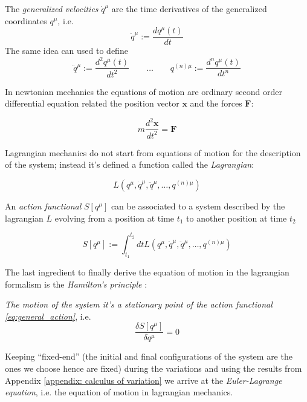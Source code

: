 \begin{definition}
  The \emph{generalized velocities} $\dot{q}^{\mu}$ are the time derivatives of the
  generalized coordinates $q^{\mu}$, i.e.
  \begin{equation*}
    \dot{q}^{\mu} := \frac{dq^{\mu}(t)}{dt}
  \end{equation*}
  The same idea can used to define
  \begin{equation*}
    \ddot{q}^{\mu} := \frac{d^2q^{\mu}(t)}{dt^2} \qquad \ldots \qquad
        q^{(n)\mu} := \frac{d^nq^{\mu}(t)}{dt^n}
  \end{equation*}
\end{definition}

In newtonian mechanics the equations of motion are ordinary second order
differential equation related the position vector $\bm{x}$ and the forces
$\bm{F}$:

\begin{equation*}
  m \frac{d^2\bm{x}}{dt^2} = \bm{F}
\end{equation*}

Lagrangian mechanics do not start from equations of motion for the description
of the system; instead it's defined a function called the \emph{Lagrangian}:

\begin{equation} \label{eq:general_lagrangian}
  L(q^{\mu}, \dot{q}^{\mu}, \ddot{q}^{\mu}, \ldots, q^{(n)\mu})
\end{equation}

An \emph{action functional} $S[q^{\mu}]$ can be associated to a system described
by the lagrangian $L$ evolving from a position at time $t_1$ to another position
at time $t_2$

\begin{equation} \label{eq:general_action}
  S[q^{\mu}] := \int_{t_1}^{t_2} dt
  L(q^{\mu}, \dot{q}^{\mu}, \ddot{q}^{\mu}, \ldots, q^{(n)\mu})
\end{equation}

The last ingredient to finally derive the equation of motion in the lagrangian
formalism is the \emph{Hamilton's principle} \cite{Goldstein11_Ham_principle}:
\begin{displayquote}
  \emph{The motion of the system it's a stationary point of the action
  functional \eqref{eq:general_action}}, i.e.
  \begin{equation*}
    \frac{\delta S[q^{\mu}]}{\delta q^{\mu}} = 0
  \end{equation*}
\end{displayquote}
Keeping ``fixed-end'' (the initial and final configurations of the system are
the ones we choose hence are fixed) during the variations and using the results
from Appendix \ref{appendix: calculus of variation} we arrive at the
\emph{Euler-Lagrange equation}, i.e. the equation of motion in lagrangian
mechanics.


